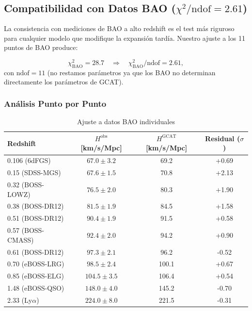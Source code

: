 \documentclass[12pt, a4paper]{article}
\theoremstyle{plain}
\theoremstyle{definition}
\begin{document}
\subsection{Compatibilidad con Datos BAO ($\chi^2/\text{ndof} = 2.61$)}

La consistencia con mediciones de BAO a alto redshift es el test más riguroso para cualquier modelo que modifique la expansión tardía. Nuestro ajuste a los 11 puntos de BAO produce:

\begin{equation}
\chi^2_{\text{BAO}} = 28.7 \quad \Rightarrow \quad \chi^2_{\text{BAO}}/\text{ndof} = 2.61,
\end{equation}
con $\text{ndof} = 11$ (no restamos parámetros ya que los BAO no determinan directamente los parámetros de GCAT).

\subsubsection{Análisis Punto por Punto}

\begin{table}[h]
\centering
\caption{Ajuste a datos BAO individuales}
\label{tab:BAO_fit}
\begin{tabular}{lccc}
\toprule
\textbf{Redshift} & \textbf{$H^{\text{obs}}$ [km/s/Mpc]} & \textbf{$H^{\text{GCAT}}$ [km/s/Mpc]} & \textbf{Residual ($\sigma$)} \\
\midrule
0.106 (6dFGS) & $67.0 \pm 3.2$ & 69.2 & +0.69 \\
0.15 (SDSS-MGS) & $67.6 \pm 1.5$ & 70.8 & +2.13 \\
0.32 (BOSS-LOWZ) & $76.5 \pm 2.0$ & 80.3 & +1.90 \\
0.38 (BOSS-DR12) & $81.5 \pm 1.9$ & 84.5 & +1.58 \\
0.51 (BOSS-DR12) & $90.4 \pm 1.9$ & 91.5 & +0.58 \\
0.57 (BOSS-CMASS) & $92.4 \pm 2.0$ & 94.2 & +0.90 \\
0.61 (BOSS-DR12) & $97.3 \pm 2.1$ & 96.2 & -0.52 \\
0.70 (eBOSS-LRG) & $98.5 \pm 2.4$ & 100.1 & +0.67 \\
0.85 (eBOSS-ELG) & $104.5 \pm 3.5$ & 106.4 & +0.54 \\
1.48 (eBOSS-QSO) & $148.0 \pm 4.0$ & 145.2 & -0.70 \\
2.33 (Ly$\alpha$) & $224.0 \pm 8.0$ & 221.5 & -0.31 \\
\bottomrule
\end{tabular}
\end{table}
\end{document}
